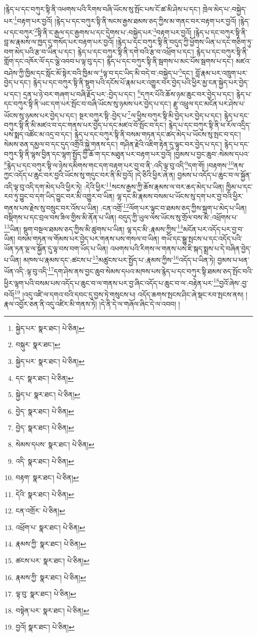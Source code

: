 །རྙེད་པ་དང་བཀུར་སྟི་ནི་འཕགས་པའི་རིགས་བཞི་ཡོངས་སུ་སྤོང་པས་ངོ་ཚ་མི་ཤེས་པ་དང་། ཁྲེལ་མེད་པ་:བསྐྱེད་པར་\footnote{སྐྱེད་པར་  སྣར་ཐང་།  པེ་ཅིན། }བརྟག་པར་བྱའོ། །རྙེད་པ་དང་བཀུར་སྟི་ནི་སངས་རྒྱས་ཐམས་ཅད་ཀྱིས་མ་གནང་བར་བརྟག་པར་བྱའོ། །རྙེད་པ་དང་བཀུར་\footnote{བསྐུར་  སྣར་ཐང་། }སྟི་ནི་ང་རྒྱལ་དང་རྒྱགས་པ་དང་དྲེགས་པ་:བསྐྱེད་པར་\footnote{སྐྱེད་པར་  སྣར་ཐང་།  པེ་ཅིན། }བརྟག་པར་བྱའོ། །རྙེད་པ་དང་བཀུར་སྟི་ནི་བླ་མ་རྣམས་ལ་ཁྱད་དུ་གསོད་པར་བརྟག་པར་བྱའོ། །རྙེད་པ་དང་བཀུར་སྟི་ནི་བདུད་ཀྱི་ཕྱོགས་ཡིན་པ་དང་གཅིག་ཏུ་བག་མེད་པའི་རྩ་བ་ཡིན་པ་དང་། རྙེད་པ་དང་བཀུར་སྟི་ནི་དགེ་བའི་རྩ་བ་འཕྲོག་པ་དང་། རྙེད་པ་དང་བཀུར་སྟི་ནི་གློག་དང་འཁོར་ལོ་དང་ལྕེ་འབབ་པ་ལྟ་བུ་དང་། རྙེད་པ་དང་བཀུར་སྟི་ནི་སྦགས་པ་མང་པོས་སྦགས་པ་དང་། མཛའ་བཤེས་ཀྱི་ཁྱིམ་དང་སློང་མོ་སྟེར་བའི་ཁྱིམ་ལ་\footnote{དང་  སྣར་ཐང་།  པེ་ཅིན། }ལྟ་བ་དང་ཡིད་མི་བདེ་བ་:བསྐྱེད་པ་\footnote{སྐྱེད་པ་  སྣར་ཐང་།  པེ་ཅིན། }དང་། བློ་རྣམ་པར་འཁྲུག་པར་བྱེད་པ་དང་། རྙེད་པ་དང་བཀུར་སྟི་ནི་སྡུག་པའི་དངོས་པོ་རྣམ་པར་འགྱུར་བར་བྱེད་པའི་ཕྱིར་མྱ་ངན་སྐྱེད་པར་བྱེད་པ་དང་། དྲན་པ་ཉེ་བར་གཞག་པ་བཞི་རྗོད་པར་:བྱེད་པ་དང་། \footnote{བྱེད་  སྣར་ཐང་།  པེ་ཅིན། }དཀར་པོའི་ཆོས་ཉམ་ཆུང་བར་བྱེད་པ་དང་། རྙེད་པ་དང་བཀུར་སྟི་ནི་ཡང་དག་པར་སྤོང་བ་བཞི་ཡོངས་སུ་ཉམས་པར་བྱེད་པ་དང་། རྫུ་འཕྲུལ་དང་མངོན་པར་ཤེས་པ་ཡོངས་སུ་ཉམས་པར་བྱེད་པ་དང་། སྔར་བཀུར་སྟི་:བྱེད་པ་\footnote{བྱེད་  སྣར་ཐང་།  པེ་ཅིན། }ལ་ཕྱིས་བཀུར་སྟི་མི་བྱེད་པར་བྱེད་པ་དང་། རྙེད་པ་དང་བཀུར་སྟི་ནི་མི་མཛའ་བ་དང་གནས་པར་བྱེད་པ་དང་མཛའ་བོ་སྤོང་བ་དང་། རྙེད་པ་དང་བཀུར་སྟི་ནི་ཕ་རོལ་འདྲིད་པས་སྨད་འཚོང་མ་འདྲ་བ་དང་། རྙེད་པ་དང་བཀུར་སྟི་ནི་བསམ་གཏན་དང་ཚད་མེད་པ་ཡོངས་སུ་སྤང་བ་དང་། སེམས་ཅན་དམྱལ་བ་དང་དུད་འགྲོའི་སྐྱེ་གནས་དང་། གཤིན་རྗེའི་འཇིག་རྟེན་དུ་ལྟུང་བར་བྱེད་པ་དང་། རྙེད་པ་དང་བཀུར་སྟི་ནི་ལྷས་བྱིན་དང་ལྷག་སྤྱོད་ཀྱི་ཆོ་ག་དང་མཐུན་པར་བརྟག་པར་བྱའོ། །བྱམས་པ་བྱང་ཆུབ་:སེམས་དཔའ་\footnote{སེམས་དཔས་  སྣར་ཐང་།  པེ་ཅིན། }རྙེད་པ་དང་བཀུར་སྟི་ལ་ཉེས་དམིགས་གང་དག་བརྟག་པར་བྱ་བ་ནི་:འདི་ལྟ་བུ་འདི་\footnote{འདི་  སྣར་ཐང་།  པེ་ཅིན། }དག་གོ། །བརྟགས་\footnote{བརྟག་  སྣར་ཐང་།  པེ་ཅིན། }ནས་ཀྱང་འདོད་པ་ཆུང་བར་བྱའི་ཡོངས་སུ་གདུང་བར་ནི་མི་བྱའོ། །དེ་ཅིའི་ཕྱིར་ཞེ་ན། བྱམས་པ་འདོད་པ་ཆུང་བ་ལ་སྐྱོན་འདི་ལྟ་བུ་འདི་དག་མེད་པའི་ཕྱིར་ཏེ། :དེའི་ཕྱིར་\footnote{དེའི་  སྣར་ཐང་།  པེ་ཅིན། }སངས་རྒྱས་ཀྱི་ཆོས་རྣམས་ལ་བར་ཆད་མེད་པ་ཡིན། ཁྱིམ་པ་དང་རབ་ཏུ་བྱུང་བ་དག་ཡིད་བྱུང་བར་མི་འགྱུར་བ་ཡིན། ལྷ་དང་མི་རྣམས་བསམ་པ་ཡོངས་སུ་དག་པར་བྱ་བའི་ཕྱིར་གནས་པས་རྗེས་སུ་བསྲུང་བར་འོས་པ་ཡིན། :ངན་འགྲོ་\footnote{ངན་འགྲོར་  པེ་ཅིན། }ལོག་པར་ལྟུང་བ་ཐམས་ཅད་ཀྱིས་སྐྲག་པ་མེད་པ་ཡིན། བསྡིགས་པ་དང་བྲལ་བས་ཟིལ་གྱིས་མི་ནོན་པ་ཡིན། བདུད་ཀྱི་ཡུལ་ལས་ཡོངས་སུ་གྲོལ་བས་མི་:འཕྲོགས་པ་\footnote{འཕྲོག་པ་  སྣར་ཐང་།  པེ་ཅིན། }ཡིན། སྡུག་བསྔལ་ཐམས་ཅད་ཀྱིས་མི་ཚུགས་པ་ཡིན། ལྷ་དང་མི་:རྣམས་ཀྱིས་\footnote{རྣམས་ཀྱི་  སྣར་ཐང་།  པེ་ཅིན། }མངོན་པར་འདོད་པར་བྱ་བ་ཡིན། བསམ་གཏན་ལ་གོམས་པར་བྱེད་པར་གནས་པས་གསལ་བ་ཡིན། གཡོ་དང་སྒྱུ་སྤངས་པ་དང་འདོད་པའི་ཡོན་ཏན་ལྔ་ལ་སྐྱོན་དུ་ལྟ་བས་བག་ཡོད་པ་ཡིན། འཕགས་པའི་རིགས་ལ་གནས་པས་ཇི་སྐད་སྨྲས་པ་དེ་བཞིན་བྱེད་པ་ཡིན། མཁས་པ་རྣམས་དང་:ཚངས་པ་\footnote{ཚངས་པར་  སྣར་ཐང་།  པེ་ཅིན། }མཚུངས་པར་སྤྱོད་པ་:རྣམས་ཀྱིས་\footnote{རྣམས་ཀྱི་  སྣར་ཐང་།  པེ་ཅིན། }འདོད་པ་ཡིན་ཏེ། བྱམས་པ་ཕན་ཡོན་འདི་:ལྟ་བུ་འདི་\footnote{ལྟ་བུ་  སྣར་ཐང་།  པེ་ཅིན། }དག་ཤེས་ནས་བྱང་ཆུབ་སེམས་དཔའ་མཁས་པས་རྙེད་པ་དང་བཀུར་སྟི་ཐམས་ཅད་སྤོང་བའི་ཕྱིར་ལྷག་པའི་བསམ་པས་འདོད་པ་ཆུང་བ་ལ་གནས་པར་བྱ་ཞིང་འདོད་པ་ཆུང་བ་ལ་:བརྟེན་པར་\footnote{བསྟེན་པར་  སྣར་ཐང་།  པེ་ཅིན། }བྱའོ་ཞེས་:བྱ་བའོ།\footnote{བྱའོ།  སྣར་ཐང་།  པེ་ཅིན། } །འདུ་འཛི་ལ་དགའ་བའི་དབང་དུ་བྱས་ཏེ་གསུངས་པ། འདོད་ཆགས་སྤངས་ཤིང་ཞེ་སྡང་རབ་སྤངས་ནས། །རྣལ་འབྱོར་ཅན་ནི་འདུ་འཛིར་མི་གནས་ཏེ། །དེ་ནི་དེ་ལ་གཞོལ་ཞིང་དེ་ལ་འབབ། །
